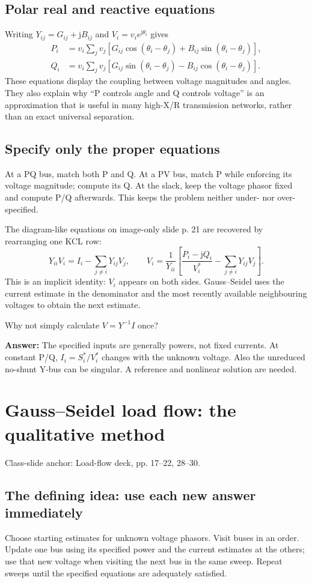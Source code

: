 \documentclass[11pt,a4paper]{article}
\newcommand{\slides}[1]{{\small\color{muted}\textsf{Class-slide anchor: #1.}}\par}
\newcommand{\chapterstart}[2]{\par\needspace{12\baselineskip}\section{#1}\label{#2}}
\newcommand{\checkq}[2]{\begin{tcolorbox}[breakable=false,colback=pale,colframe=teal,coltitle=white,title={Check your understanding}]#1\par\textbf{Answer:} #2\end{tcolorbox}}
\newcommand{\jj}{\mathrm j}
\begin{document}
\subsection{Polar real and reactive equations}
Writing $Y_{ij}=G_{ij}+\jj B_{ij}$ and $V_i=v_ie^{\jj\theta_i}$ gives
\begin{align*}
P_i&=v_i\sum_jv_j\left[G_{ij}\cos(\theta_i-\theta_j)+B_{ij}\sin(\theta_i-\theta_j)\right],\\
Q_i&=v_i\sum_jv_j\left[G_{ij}\sin(\theta_i-\theta_j)-B_{ij}\cos(\theta_i-\theta_j)\right].
\end{align*}
These equations display the coupling between voltage magnitudes and angles. They also explain why ``P controls angle and Q controls voltage'' is an approximation that is useful in many high-X/R transmission networks, rather than an exact universal separation.
\subsection{Specify only the proper equations}
At a PQ bus, match both P and Q. At a PV bus, match P while enforcing its voltage magnitude; compute its Q. At the slack, keep the voltage phasor fixed and compute P/Q afterwards. This keeps the problem neither under- nor over-specified.

The diagram-like equations on image-only slide p. 21 are recovered by rearranging one KCL row:
\[
Y_{ii}V_i=I_i-\sum_{j\ne i}Y_{ij}V_j,
\qquad
\boxed{V_i=\frac1{Y_{ii}}\left[\frac{P_i-\jj Q_i}{V_i^*}-\sum_{j\ne i}Y_{ij}V_j\right]}.
\]
This is an implicit identity: $V_i$ appears on both sides. Gauss--Seidel uses the current estimate in the denominator and the most recently available neighbouring voltages to obtain the next estimate.
\checkq{Why not simply calculate $V=Y^{-1}I$ once?}{The specified inputs are generally powers, not fixed currents. At constant P/Q, $I_i=S_i^*/V_i^*$ changes with the unknown voltage. Also the unreduced no-shunt Y-bus can be singular. A reference and nonlinear solution are needed.}

\chapterstart{Gauss--Seidel load flow: the qualitative method}{gs}
\slides{Load-flow deck, pp. 17--22, 28--30}
\subsection{The defining idea: use each new answer immediately}
Choose starting estimates for unknown voltage phasors. Visit buses in an order. Update one bus using its specified power and the current estimates at the others; use that new voltage when visiting the next bus in the same sweep. Repeat sweeps until the specified equations are adequately satisfied.
\end{document}
